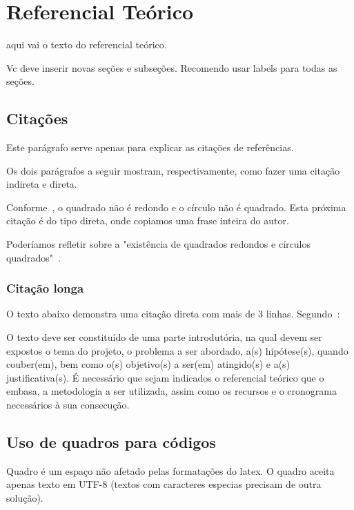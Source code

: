 \chapter{Referencial Teórico}\label{ch:ref}
aqui vai o texto do referencial teórico. 

Vc deve inserir novas seções e subseções. Recomendo usar labels para todas as seções.

\section{Citações}\label{sec:citacao}

Este parágrafo serve apenas para explicar as citações de referências. 

Os dois parágrafos a seguir mostram, respectivamente, como fazer uma citação indireta e direta. 

Conforme~, o quadrado não é redondo e o círculo não é quadrado. Esta próxima citação é do tipo direta, onde copiamos uma frase inteira do autor. 

Poderíamos refletir sobre a "existência de quadrados redondos e círculos quadrados"~\cite{ericson2004real}. 


\subsection{Citação longa}\label{subsec:citacaoLonga}

O texto abaixo demonstra uma citação direta com mais de 3 linhas. Segundo~\cite{ericson2004real}:

\begin{citacao}
	O texto deve ser constituído de uma parte introdutória, na qual devem ser
	expostos o tema do projeto, o problema a ser abordado, a(s) hipótese(s),
	quando couber(em), bem como o(s) objetivo(s) a ser(em) atingido(s) e a(s)
	justificativa(s). É necessário que sejam indicados o referencial teórico que
	o embasa, a metodologia a ser utilizada, assim como os recursos e o cronograma
	necessários à sua consecução.
\end{citacao}


\section{Uso de quadros para códigos}\label{sec:quadros}

Quadro é um espaço não afetado pelas formatações do latex. O quadro aceita apenas texto em UTF-8 (textos com caracteres especias precisam de outra solução).

